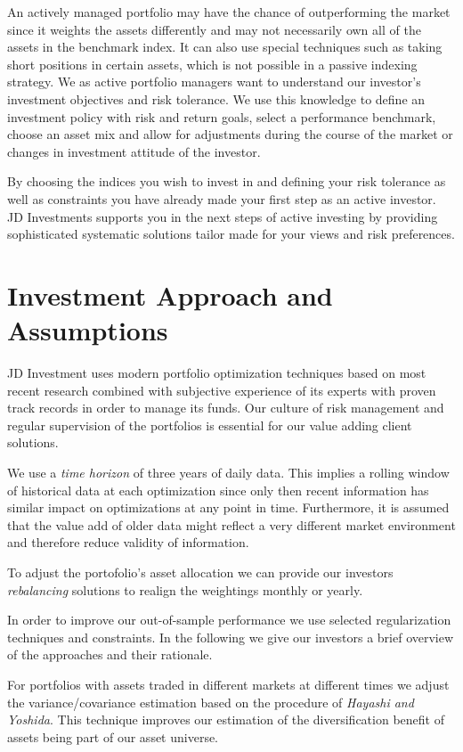 \documentclass[11pt, DIV=15]{scrreprt}
\begin{document}
An actively managed portfolio may have the chance of outperforming the market since it weights the assets differently and may not necessarily own all of the assets in the benchmark index.
It can also use special techniques such as taking short positions in certain assets, which is not possible in a passive indexing strategy.
We as active portfolio managers want to understand our investor’s investment objectives and risk tolerance.
We use this knowledge to define an investment policy with risk and return goals, select a performance benchmark, choose an asset mix and allow for adjustments during the course of the market or changes in investment attitude of the investor.

By choosing the indices you wish to invest in and defining your risk tolerance as well as constraints you have already made your first step as an active investor.
JD Investments supports you in the next steps of active investing by providing sophisticated systematic solutions tailor made for your views and risk preferences.

 
\section*{Investment Approach and Assumptions}
JD Investment uses modern portfolio optimization techniques based on most recent research combined with subjective experience of its experts with proven track records in order to manage its funds.
Our culture of risk management and regular supervision of the portfolios is essential for our value adding client solutions.

We use a \textit{time horizon} of three years of daily data.
This implies a rolling window of historical data at each optimization since only then recent information has similar impact on optimizations at any point in time.
Furthermore, it is assumed that the value add of older data might reflect a very different market environment and therefore reduce validity of information.

 To adjust the portofolio’s asset allocation we can provide our investors \textit{rebalancing} solutions to realign the weightings monthly or yearly.

In order to improve our out-of-sample performance we use selected regularization techniques and constraints.
In the following we give our investors a brief overview of the approaches and their rationale.
 
For portfolios with assets traded in different markets at different times we adjust the variance/covariance estimation based on the procedure of \textit{Hayashi and Yoshida}.
This technique improves our estimation of the diversification benefit of assets being part of our asset universe.
\end{document}
